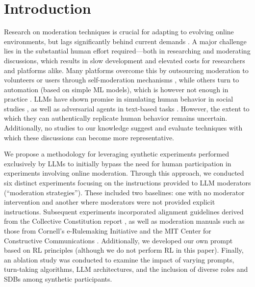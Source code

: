 %

\section{Introduction}
\label{sec:introduction}


Research on moderation techniques is crucial for adapting to evolving online environments, but lags significantly behind current demands \cite{seering_self_moderation, make_reddit_great}. A major challenge lies in the substantial human effort required—both in researching and moderating discussions, which results in slow development and elevated costs for researchers and platforms alike. Many platforms overcome this by outsourcing moderation to volunteers or users through self-moderation mechanisms \cite{Matias2019TheCL, schaffner_community_guidelines}, while others turn to automation (based on simple \ac{ML} models), which is however not enough in practice \cite{horta_automated_moderation, schaffner_community_guidelines}. \acfp{LLM} have shown promise in simulating human behavior in social studies \cite{park2024generativeagentsimulations1000, hewitt2024predicting, Park2023GenerativeAI}, as well as adversarial agents in text-based tasks \cite{cheng-self-play}. However, the extent to which they can authentically replicate human behavior remains uncertain. Additionally, no studies to our knowledge suggest and evaluate techniques with which these discussions can become more representative.

We propose a methodology for leveraging synthetic experiments performed exclusively by \acp{LLM} to initially bypass the need for human participation in experiments involving online moderation.  Through this approach, we conducted six distinct experiments focusing on the instructions provided to \ac{LLM} moderators (“moderation strategies”). These included two baselines: one with no moderator intervention and another where moderators were not provided explicit instructions. Subsequent experiments incorporated alignment guidelines derived from the Collective Constitution report \cite{collective_constitution}, as well as moderation manuals such as those from Cornell's e-Rulemaking Initiative \cite{Cornell_eRulemaking2017} and the MIT Center for Constructive Communications \cite{dimitra-book}. Additionally, we developed our own prompt based on \ac{RL} principles (although we do not perform \ac{RL} in this paper). Finally, an ablation study was conducted to examine the impact of varying prompts, turn-taking algorithms, \ac{LLM} architectures, and the inclusion of diverse roles and \acp{SDB} among synthetic participants.

